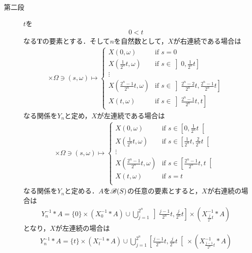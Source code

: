 \begin{sketch}
\begin{description}
			\item[第二段] $t$を
				\begin{align}
					0 < t
				\end{align}
				なる$\mathbf{T}$の要素とする．そして$n$を自然数として，$X$が右連続である場合は
				\begin{align}
					[0,t] \times \Omega \ni (s,\omega) \longmapsto
					\begin{cases}
						X(0,\omega) & \mbox{if } s=0 \\
						X\left(\frac{1}{2^n}t,\omega\right) & \mbox{if } s \in \left]0,\frac{1}{2^n}t\right] \\
						\vdots & \\
						X\left(\frac{2^n-1}{2^n}t,\omega\right) & \mbox{if } s \in \left]\frac{2^n-2}{2^n}t,\frac{2^n-1}{2^n}t\right] \\
						X\left(t,\omega\right) & \mbox{if } s \in \left]\frac{2^n-1}{2^n}t,t\right]
					\end{cases}
				\end{align}
				なる関係を$Y_n$と定め，$X$が左連続である場合は
				\begin{align}
					[0,t] \times \Omega \ni (s,\omega) \longmapsto
					\begin{cases}
						X(0,\omega) & \mbox{if } s \in \left[0,\frac{1}{2^n}t\right[ \\
						X\left(\frac{1}{2^n}t,\omega\right) & \mbox{if } s \in \left[\frac{1}{2^n}t,\frac{2}{2^n}t\right[ \\
						\vdots & \\
						X\left(\frac{2^n-1}{2^n}t,\omega\right) & \mbox{if } s \in \left[\frac{2^n-1}{2^n}t,t\right[ \\
						X\left(t,\omega\right) & \mbox{if } s = t \\
					\end{cases}
				\end{align}
				なる関係を$Y_n$と定める．$A$を$\mathscr{B}(S)$の任意の要素とすると，$X$が右連続の場合は
				\begin{align}
					Y_n^{-1} \ast A
					= \{0\} \times \left( X_0^{-1} \ast A \right) \cup
					\bigcup_{j=1}^{2^n} \left]\frac{j-1}{2^n}t,\frac{j}{2^n}t\right] \times \left( X_{\frac{j}{2^n}t}^{-1} \ast A \right)
				\end{align}
				となり，$X$が左連続の場合は
				\begin{align}
					Y_n^{-1} \ast A
					= \{t\} \times \left( X_t^{-1} \ast A \right) \cup
					\bigcup_{j=1}^{2^n} \left[\frac{j-1}{2^n}t,\frac{j}{2^n}t\right[ \times \left( X_{\frac{j-1}{2^n}t}^{-1} \ast A \right)

\end{align}
\end{description}
\end{sketch}
